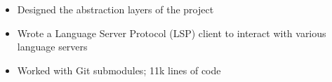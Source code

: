 \begin{itemize}
  \item Designed the abstraction layers of the project
  \item Wrote a Language Server Protocol (LSP) client to interact with various language servers
  \item Worked with Git submodules; 11k lines of code
\end{itemize}
\vspace{4pt}
